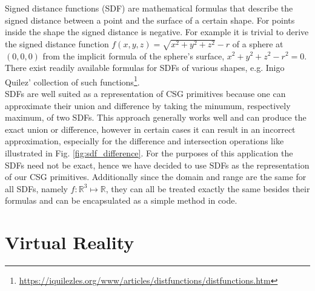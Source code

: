 Signed distance functions (SDF) are mathematical formulas that describe the signed distance between a point and the surface of a certain shape. For points inside the shape the
signed distance is negative. For example it is trivial to derive the signed distance function $f(x,y,z) = \sqrt{x^2 + y^2 + z^2} - r$ of a sphere at $(0, 0, 0)$ from the implicit formula of the sphere's surface, $x^2 + y^2 + z^2 - r^2 = 0$. There exist readily available formulas for SDFs of various shapes, e.g. Inigo Quilez' collection of such functions\footnote{\url{https://iquilezles.org/www/articles/distfunctions/distfunctions.htm}}.\\
SDFs are well suited as a representation of CSG primitives because one can approximate their union and difference by taking the minumum, respectively maximum, of two SDFs. This approach generally works
well and can produce the exact union or difference, however in certain cases it can result in an incorrect approximation, especially for the difference and intersection operations like illustrated in Fig. \ref{fig:sdf_difference}.
For the purposes of this application the SDFs need not be exact, hence we have decided to use SDFs as the representation of our CSG primitives. Additionally since the domain and range are the same for all SDFs, namely
$f\colon \mathbb{R}^3 \mapsto \mathbb{R}$, they can all be treated exactly the same besides their formulas and can be encapsulated as a simple method in code.


\section{Virtual Reality}

